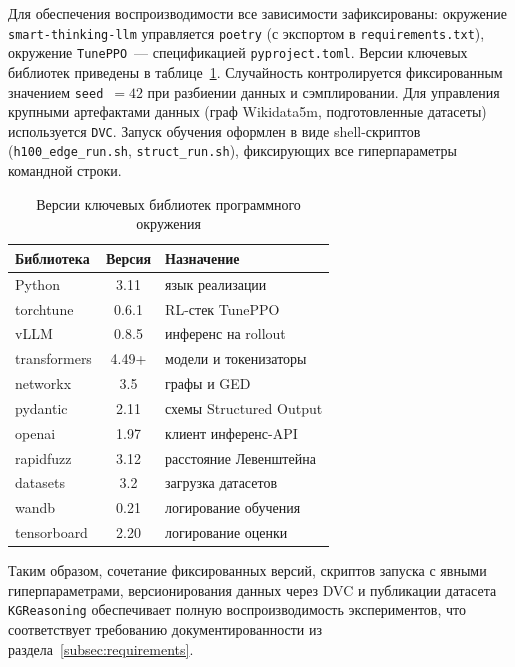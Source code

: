 Для обеспечения воспроизводимости все зависимости зафиксированы: окружение \texttt{smart-thinking-llm} управляется \texttt{poetry} (с экспортом в \texttt{requirements.txt}), окружение \texttt{TunePPO}~--- спецификацией \texttt{pyproject.toml}. Версии ключевых библиотек приведены в таблице~\ref{tab:versions}. Случайность контролируется фиксированным значением \texttt{seed}~$=42$ при разбиении данных и сэмплировании. Для управления крупными артефактами данных (граф Wikidata5m, подготовленные датасеты) используется \texttt{DVC}. Запуск обучения оформлен в виде shell-скриптов (\texttt{h100\_edge\_run.sh}, \texttt{struct\_run.sh}), фиксирующих все гиперпараметры командной строки.

\begin{table}[H]
\centering
\caption{Версии ключевых библиотек программного окружения}
\label{tab:versions}
\small
\begin{tabular}{|l|c|l|}
\hline
\textbf{Библиотека} & \textbf{Версия} & \textbf{Назначение} \\
\hline
Python        & 3.11        & язык реализации \\
torchtune     & 0.6.1       & RL-стек TunePPO \\
vLLM          & 0.8.5       & инференс на rollout \\
transformers  & 4.49+       & модели и токенизаторы \\
networkx      & 3.5         & графы и GED \\
pydantic      & 2.11        & схемы Structured Output \\
openai        & 1.97        & клиент инференс-API \\
rapidfuzz     & 3.12        & расстояние Левенштейна \\
datasets      & 3.2         & загрузка датасетов \\
wandb         & 0.21        & логирование обучения \\
tensorboard   & 2.20        & логирование оценки \\
\hline
\end{tabular}
\end{table}

Таким образом, сочетание фиксированных версий, скриптов запуска с явными гиперпараметрами, версионирования данных через DVC и публикации датасета \texttt{KGReasoning} обеспечивает полную воспроизводимость экспериментов, что соответствует требованию документированности из раздела~\ref{subsec:requirements}.
